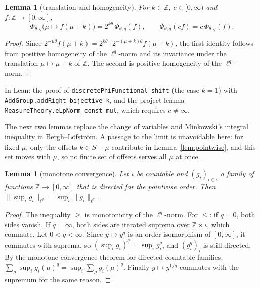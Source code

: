 \documentclass[11pt]{article}
\newtheorem{lemma}[theorem]{Lemma}
\theoremstyle{definition}
\theoremstyle{remark}
\newcommand{\norm}[2]{\lVert #1\rVert_{#2}}
\newcommand{\Z}{\mathbb Z}
\begin{document}
\begin{lemma}[translation and homogeneity]\label{lem:shift}
  For \(k \in \Z\), \(c \in [0,\infty)\) and \(f \colon \Z \to [0,\infty]\),
  \[
    \Phi_{\theta,q}\bigl(\mu \mapsto f(\mu+k)\bigr) = 2^{k\theta}\,\Phi_{\theta,q}(f),
    \qquad
    \Phi_{\theta,q}(c f) = c\,\Phi_{\theta,q}(f).
  \]
\end{lemma}

\begin{proof}
  Since \(2^{-\mu\theta} f(\mu+k) = 2^{k\theta}\cdot 2^{-(\mu+k)\theta}f(\mu+k)\), the first
  identity follows from positive homogeneity of the \(\ell^q\)-norm and its invariance under the
  translation \(\mu \mapsto \mu + k\) of \(\Z\). The second is positive homogeneity of the
  \(\ell^q\)-norm.
\end{proof}

In Lean: the proof of \texttt{discretePhiFunctional\_shift} (the case \(k = 1\)) with
\texttt{AddGroup.addRight\_bijective k}, and the project lemma
\texttt{MeasureTheory.eLpNorm\_const\_mul}, which requires \(c \ne \infty\).

The next two lemmas replace the change of variables and Minkowski's integral inequality in
Bergh--L\"ofstr\"om. A passage to the limit is unavoidable here: for fixed \(\mu\), only the
offsets \(k \in S - \mu\) contribute in Lemma~\ref{lem:pointwise}, and this set moves with
\(\mu\), so no finite set of offsets serves all \(\mu\) at once.

\begin{lemma}[monotone convergence]\label{lem:mct}
  Let \(\iota\) be countable and \((g_i)_{i \in \iota}\) a family of functions
  \(\Z \to [0,\infty]\) that is directed for the pointwise order. Then
  \(\norm{\sup_i g_i}{\ell^q} = \sup_i \norm{g_i}{\ell^q}\).
\end{lemma}

\begin{proof}
  The inequality \(\ge\) is monotonicity of the \(\ell^q\)-norm. For \(\le\):
  if \(q = 0\), both sides vanish. If \(q = \infty\), both sides are iterated suprema over
  \(\Z \times \iota\), which commute. Let \(0 < q < \infty\). Since \(y \mapsto y^q\) is an
  order isomorphism of \([0,\infty]\), it commutes with suprema, so
  \((\sup_i g_i)^q = \sup_i g_i^q\), and \((g_i^q)_i\) is still directed. By the monotone
  convergence theorem for directed countable families,
  \(\sum_\mu \sup_i g_i(\mu)^q = \sup_i \sum_\mu g_i(\mu)^q\). Finally \(y \mapsto y^{1/q}\)
  commutes with the supremum for the same reason.
\end{proof}
\end{document}
